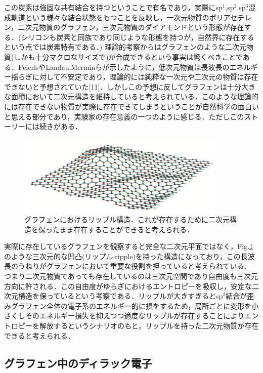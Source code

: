 この炭素は強固な共有結合を持つということで有名であり，実際にsp$^{1}$,sp$^{2}$,sp$^{3}$混成軌道という様々な結合状態をもつことを反映し，一次元物質のポリアセチレン，二次元物質のグラフェン，三次元物質のダイアモンドという形態が存在する．(シリコンも炭素と同族であり同じような形態を持つが，自然界に存在するという点では炭素特有である．)
理論的考察からはグラフェンのような二次元物質(しかも十分マクロなサイズで)が合成できるという事実は驚くべきことである．PeierlsやLandau,Merminらが示したように，低次元物質は長波長のエネルギー揺らぎに対して不安定であり，理論的には純粋な一次元や二次元の物質は存在できないと予想されていた[11]．しかしこの予想に反してグラフェンは十分大きな面積において二次元構造を維持していると考えられている．このような理論的には存在できない物質が実際に存在できてしまうということが自然科学の面白いと思える部分であり，実験家の存在意義の一つのように感じる．ただしこのストーリーには続きがある．
\begin{figure}[t]
 \begin{center}
  \includegraphics[width=100mm]{images/ripple.png}
  \end{center}
   \caption{グラフェンにおけるリップル構造．これが存在するために二次元構造を保ったまま存在することができると考えられる．}
 \label{fig:ripple}
\end{figure}

実際に存在しているグラフェンを観察すると完全な二次元平面ではなく，Fig.\ref{fig:ripple}のような三次元的な凹凸(リップル:ripple)を持った構造になっており，この長波長のうねりがグラフェンにおいて重要な役割を担っていると考えられている．
つまり二次元物質であっても存在しているのは三次元空間であり自由度も三次元方向に許される．この自由度がゆらぎにおけるエントロピーを吸収し，安定な二次元構造を保っているという考察である．リップルが大きすぎるとsp$^{2}$結合が歪みグラフェン全体の電子系のエネルギー的に損をするため，局所ごとに変形を小さくしそのエネルギー損失を抑えつつ適度なリップルが存在することによりエントロピーを解放するというシナリオのもと，リップルを持った二次元物質が存在できると考えられる．


\subsection{グラフェン中のディラック電子}

